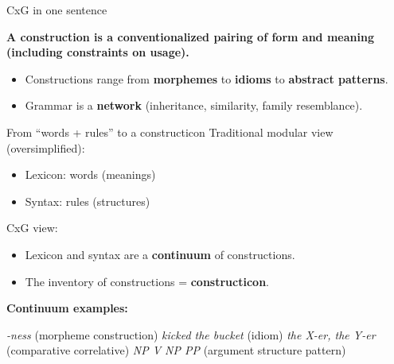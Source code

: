 \begin{frame}{CxG in one sentence}
\large
\begin{center}
\textbf{A construction is a conventionalized pairing of form and meaning}\\
\textbf{(including constraints on usage).}
\end{center}

\vspace{0.75em}
\normalsize
\begin{itemize}
  \item Constructions range from \textbf{morphemes} to \textbf{idioms} to \textbf{abstract patterns}.
  \item Grammar is a \textbf{network} (inheritance, similarity, family resemblance).
\end{itemize}
\end{frame}

\begin{frame}{From “words + rules” to a constructicon}
\small
Traditional modular view (oversimplified):
\begin{itemize}
  \item Lexicon: words (meanings)
  \item Syntax: rules (structures)
\end{itemize}

\vspace{0.5em}
CxG view:
\begin{itemize}
  \item Lexicon and syntax are a \textbf{continuum} of constructions.
  \item The inventory of constructions = \textbf{constructicon}.
\end{itemize}

\vspace{0.75em}
\textbf{Continuum examples:}

\begin{exe}
  \ex \emph{-ness} (morpheme construction)
  \ex \emph{kicked the bucket} (idiom)
  \ex \emph{the X-er, the Y-er} (comparative correlative)
  \ex \emph{NP V NP PP} (argument structure pattern)
\end{exe}

\end{frame}

